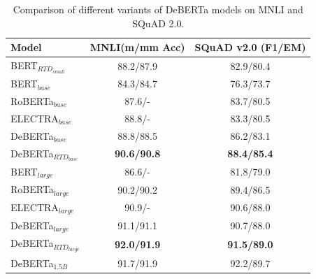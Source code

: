 \begin{table}[ht]
    \centering
    \begin{tabular}{l | c  | c}
    \toprule
    Model & MNLI(m/mm Acc)&  SQuAD v2.0 (F1/EM) \\ 
    \hline
    BERT$_{RTD_{small}}$ &88.2/87.9 & 82.9/80.4\\ \hline \hline 
    BERT$_{base}$ &84.3/84.7 & 76.3/73.7\\ 
    RoBERTa$_{base}$ &87.6/- & 83.7/80.5\\ 
    ELECTRA$_{base}$ &88.8/- &83.3/80.5\\ \hline 
    DeBERTa$_{base}$ &88.8/88.5 & 86.2/83.1 \\ 
    DeBERTa$_{RTD_{base}}$ &\textbf{90.6/90.8} & \textbf{88.4/85.4} \\ \hline \hline   
    BERT$_{large}$ &86.6/- &81.8/79.0 \\ 
    RoBERTa$_{large}$ &90.2/90.2 & 89.4/86.5 \\
    ELECTRA$_{large}$ &90.9/- & 90.6/88.0\\ \hline 
    DeBERTa$_{large}$ &91.1/91.1 & 90.7/88.0 \\ 
    DeBERTa$_{RTD_{large}}$ &\textbf{92.0/91.9} & \textbf{91.5/89.0} \\ \hline \hline 
    DeBERTa$_{1.5B}$ &91.7/91.9 & 92.2/89.7 \\
    \bottomrule
    \end{tabular}
    \caption{Comparison of different variants of DeBERTa models on MNLI and SQuAD 2.0.}
    \label{tab:delectra}
\end{table}

